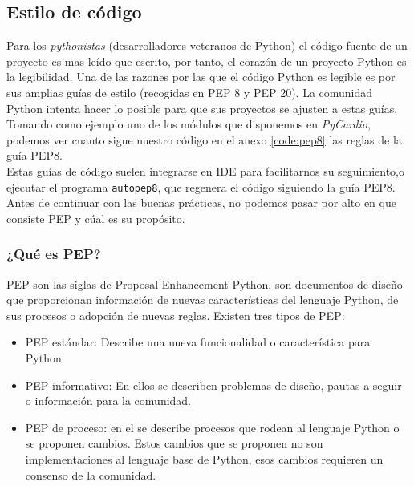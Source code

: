 \subsection*{Estilo de código}
\label{subsec:stylePython}
Para los \emph{pythonistas} (desarrolladores veteranos de Python) el código fuente de un proyecto es mas leído que escrito, por tanto, el corazón de un proyecto Python es la legibilidad. Una de las razones por las que el código Python es legible es por sus amplias guías de estilo (recogidas en PEP 8 y PEP 20). La comunidad Python intenta hacer lo posible para que sus proyectos se ajusten a estas guías. Tomando como ejemplo uno de los módulos que disponemos en \emph{PyCardio}, podemos ver cuanto sigue nuestro código en el anexo \ref{code:pep8} las reglas de la guía PEP8. \\ 

Estas guías de código suelen integrarse en IDE para facilitarnos su seguimiento,o ejecutar el programa \texttt{autopep8}, que regenera el código siguiendo la guía PEP8. Antes de continuar con las buenas prácticas, no podemos pasar por alto en que consiste PEP y cúal es su propósito. \\
\subsubsection*{¿Qué es PEP?}
PEP son las siglas de Proposal Enhancement Python, son documentos de diseño que proporcionan información de nuevas características del lenguaje Python, de sus procesos o adopción de nuevas reglas. Existen tres tipos de PEP:
\begin{itemize}
    \item PEP estándar: Describe una nueva funcionalidad o característica para Python. 
    \item PEP informativo: En ellos se describen problemas de diseño, pautas a seguir o información para la comunidad.
    \item PEP de proceso: en el se describe procesos que rodean al lenguaje Python o se proponen cambios. Estos cambios que se proponen no son implementaciones al lenguaje base de Python, esos cambios requieren un consenso de la comunidad. 
\end{itemize}

